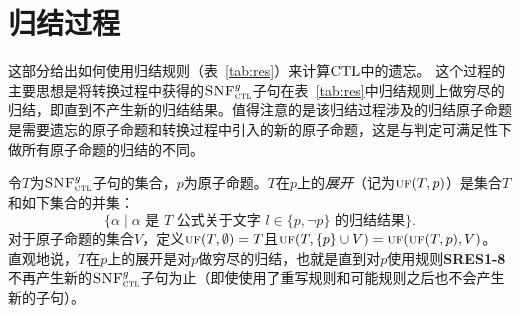 %	
%	
%
%
%	



\section{归结过程}
\label{cha4:sec:resf}
这部分给出如何使用归结规则（表~\ref{tab:res}）来计算$\textrm{CTL}$中的遗忘。
这个过程的主要思想是将转换过程中获得的${\textsc{SNF}_{\textsc{ctl}}^g}$子句在表~\ref{tab:res}中归结规则上做穷尽的归结，即直到不产生新的归结结果。值得注意的是该归结过程涉及的归结原子命题是需要遗忘的原子命题和转换过程中引入的新的原子命题，这是与判定可满足性下做所有原子命题的归结的不同。

令$T$为${\textsc{SNF}_{\textsc{ctl}}^g}$子句的集合，$p$为原子命题。$T$在$p$上的\emph{展开}（记为$\textsc{uf}(T,p)$）是集合$T$和如下集合的并集：
\[\{\alpha\mid \mbox{$\alpha$ 是 $T$ 公式关于文字 $l\in\{p,\neg p\}$ 的归结结果}\}.  \]
对于原子命题的集合$V$，定义$\textsc{uf}(T,\emptyset)=T$且$\textsc{uf}(T,\{p\}\cup V)=\textsc{uf}(\textsc{uf}(T,p), V)$。
直观地说，$T$在$p$上的展开是对$p$做穷尽的归结，也就是直到对$p$使用规则{\bf SRES1-8}不再产生新的${\textsc{SNF}_{\textsc{ctl}}^g}$子句为止（即使使用了重写规则和可能规则之后也不会产生新的子句）。


